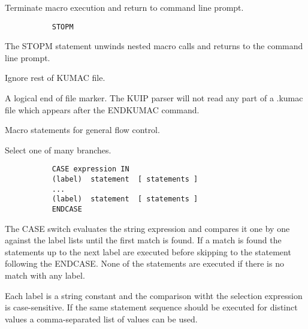 \ENDCMD


   \par
Terminate macro execution and return to command line prompt.  

\begin{verbatim}
           STOPM
\end{verbatim}
\ENDVERB
   \par
The STOPM statement unwinds nested macro calls and returns to the command 
   line prompt.  

\ENDCMD


   \par
Ignore rest of KUMAC file.  

   \par
A logical \DQUOTE{}end of file\DQUOTE{} marker.  The KUIP parser will not 
   read any part of a .kumac file which appears after the 
   \DQUOTE{}ENDKUMAC\DQUOTE{} command.  

\ENDCMD
{}
\ifMENUtext
   \par
Macro statements for general flow control.  


\fi


   \par
Select one of many branches.  

\begin{verbatim}
           CASE expression IN
           (label)  statement  [ statements ]
           ...
           (label)  statement  [ statements ]
           ENDCASE
\end{verbatim}
\ENDVERB
   \par
The CASE switch evaluates the string expression and compares it one by one 
   against the label lists until the first match is found. If a match is found 
   the statements up to the next label are executed before skipping to the 
   statement following the ENDCASE. None of the statements are executed if 
   there is no match with any label.  

   \par
Each label is a string constant and the comparison witht the selection 
   expression is case-sensitive.  If the same statement sequence should be 
   executed for distinct values a comma-separated list of values can be used.  

